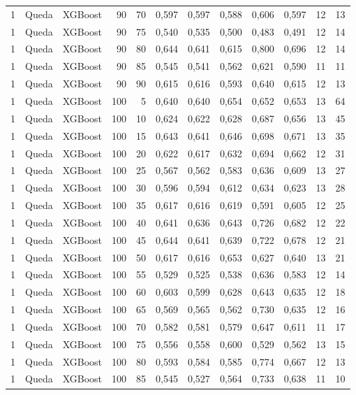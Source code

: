 \begin{longtable}{@{}rllrrrrrrrrr@{}}
1 & Queda & XGBoost & 90 & 70 & 0,597 & 0,597 & 0,588 & 0,606 & 0,597 & 12 & 13 \\
1 & Queda & XGBoost & 90 & 75 & 0,540 & 0,535 & 0,500 & 0,483 & 0,491 & 12 & 14 \\
1 & Queda & XGBoost & 90 & 80 & 0,644 & 0,641 & 0,615 & 0,800 & 0,696 & 12 & 14 \\
1 & Queda & XGBoost & 90 & 85 & 0,545 & 0,541 & 0,562 & 0,621 & 0,590 & 11 & 11 \\
1 & Queda & XGBoost & 90 & 90 & 0,615 & 0,616 & 0,593 & 0,640 & 0,615 & 12 & 13 \\
1 & Queda & XGBoost & 100 & 5 & 0,640 & 0,640 & 0,654 & 0,652 & 0,653 & 13 & 64 \\
1 & Queda & XGBoost & 100 & 10 & 0,624 & 0,622 & 0,628 & 0,687 & 0,656 & 13 & 45 \\
1 & Queda & XGBoost & 100 & 15 & 0,643 & 0,641 & 0,646 & 0,698 & 0,671 & 13 & 35 \\
1 & Queda & XGBoost & 100 & 20 & 0,622 & 0,617 & 0,632 & 0,694 & 0,662 & 12 & 31 \\
1 & Queda & XGBoost & 100 & 25 & 0,567 & 0,562 & 0,583 & 0,636 & 0,609 & 13 & 27 \\
1 & Queda & XGBoost & 100 & 30 & 0,596 & 0,594 & 0,612 & 0,634 & 0,623 & 13 & 28 \\
1 & Queda & XGBoost & 100 & 35 & 0,617 & 0,616 & 0,619 & 0,591 & 0,605 & 12 & 25 \\
1 & Queda & XGBoost & 100 & 40 & 0,641 & 0,636 & 0,643 & 0,726 & 0,682 & 12 & 22 \\
1 & Queda & XGBoost & 100 & 45 & 0,644 & 0,641 & 0,639 & 0,722 & 0,678 & 12 & 21 \\
1 & Queda & XGBoost & 100 & 50 & 0,617 & 0,616 & 0,653 & 0,627 & 0,640 & 13 & 21 \\
1 & Queda & XGBoost & 100 & 55 & 0,529 & 0,525 & 0,538 & 0,636 & 0,583 & 12 & 14 \\
1 & Queda & XGBoost & 100 & 60 & 0,603 & 0,599 & 0,628 & 0,643 & 0,635 & 12 & 18 \\
1 & Queda & XGBoost & 100 & 65 & 0,569 & 0,565 & 0,562 & 0,730 & 0,635 & 12 & 16 \\
1 & Queda & XGBoost & 100 & 70 & 0,582 & 0,581 & 0,579 & 0,647 & 0,611 & 11 & 17 \\
1 & Queda & XGBoost & 100 & 75 & 0,556 & 0,558 & 0,600 & 0,529 & 0,562 & 13 & 15 \\
1 & Queda & XGBoost & 100 & 80 & 0,593 & 0,584 & 0,585 & 0,774 & 0,667 & 12 & 13 \\
1 & Queda & XGBoost & 100 & 85 & 0,545 & 0,527 & 0,564 & 0,733 & 0,638 & 11 & 10 \\

\end{longtable}

